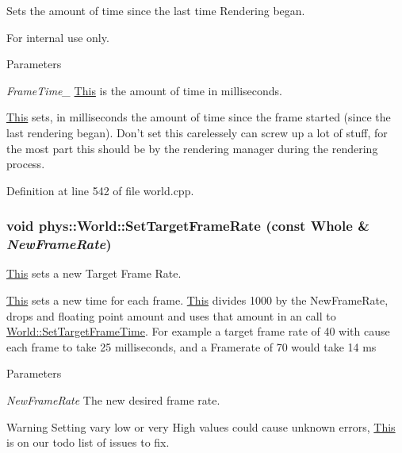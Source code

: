 Sets the amount of time since the last time Rendering began. 

\begin{DoxyInternal}{For internal use only.}

\begin{DoxyParams}{Parameters}
\item[{\em FrameTime\_\-}]\hyperlink{structThis}{This} is the amount of time in milliseconds.\end{DoxyParams}
\hyperlink{structThis}{This} sets, in milliseconds the amount of time since the frame started (since the last rendering began). Don't set this carelessely can screw up a lot of stuff, for the most part this should be by the rendering manager during the rendering process. \end{DoxyInternal}


Definition at line 542 of file world.cpp.

\hypertarget{classphys_1_1World_a76dfcde35392291aafd6eb1a64b3c95c}{
\subsubsection[{SetTargetFrameRate}]{\setlength{\rightskip}{0pt plus 5cm}void phys::World::SetTargetFrameRate (const {\bf Whole} \& {\em NewFrameRate})}}
\label{da/ddf/classphys_1_1World_a76dfcde35392291aafd6eb1a64b3c95c}


\hyperlink{structThis}{This} sets a new Target Frame Rate. 

\hyperlink{structThis}{This} sets a new time for each frame. \hyperlink{structThis}{This} divides 1000 by the NewFrameRate, drops and floating point amount and uses that amount in an call to \hyperlink{classphys_1_1World_ad95b5a5ad73e0a05826b5bd834876333}{World::SetTargetFrameTime}. For example a target frame rate of 40 with cause each frame to take 25 milliseconds, and a Framerate of 70 would take 14 ms 
\begin{DoxyParams}{Parameters}
\item[{\em NewFrameRate}]The new desired frame rate. \end{DoxyParams}
\begin{DoxyWarning}{Warning}
Setting vary low or very High values could cause unknown errors, \hyperlink{structThis}{This} is on our todo list of issues to fix. 
\end{DoxyWarning}


